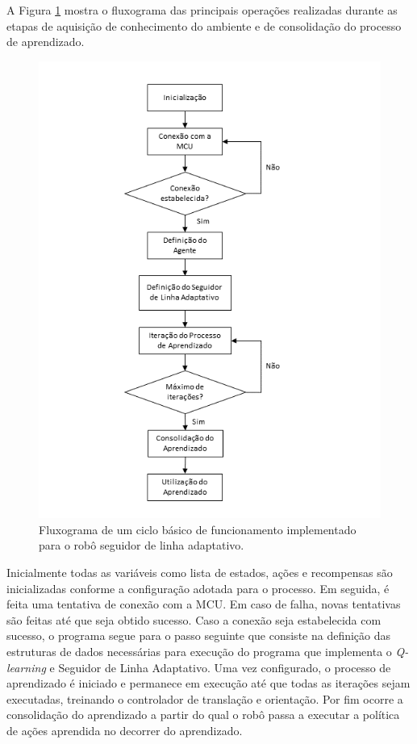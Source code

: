 \documentclass[a4paper]{ifacconf}
\begin{document}
A Figura \ref{fig:alfFlux} mostra o fluxograma das principais operações realizadas durante as etapas de aquisição de conhecimento do ambiente e de consolidação do processo de aprendizado. 

\begin{figure}
\centering
\includegraphics[scale=0.65]{Figuras/alfFlux2.png} 
\caption{Fluxograma de um ciclo básico de funcionamento implementado para o robô seguidor de linha adaptativo.}
 \label{fig:alfFlux}
\end{figure}

Inicialmente todas as variáveis como lista de estados, ações e recompensas são inicializadas conforme a configuração adotada para o processo. Em seguida, é feita uma tentativa de conexão com a MCU. Em caso de falha, novas tentativas são feitas até que seja obtido sucesso. Caso a conexão seja estabelecida com sucesso, o programa segue para o passo seguinte que consiste na definição das estruturas de dados necessárias para execução do programa que implementa o \textit{Q-learning} e Seguidor de Linha Adaptativo. Uma vez configurado, o processo de aprendizado é iniciado e permanece em execução até que todas as iterações sejam executadas, treinando o controlador de translação e orientação. Por fim ocorre a consolidação do aprendizado a partir do qual o robô passa a executar a política de ações aprendida no decorrer do aprendizado.
\end{document}
